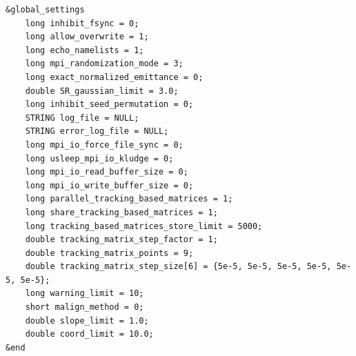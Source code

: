 \documentclass[11pt]{article}
\begin{document}
\begin{verbatim}
&global_settings
    long inhibit_fsync = 0;
    long allow_overwrite = 1;
    long echo_namelists = 1;
    long mpi_randomization_mode = 3;
    long exact_normalized_emittance = 0;
    double SR_gaussian_limit = 3.0;
    long inhibit_seed_permutation = 0;
    STRING log_file = NULL;
    STRING error_log_file = NULL;
    long mpi_io_force_file_sync = 0;
    long usleep_mpi_io_kludge = 0;
    long mpi_io_read_buffer_size = 0;
    long mpi_io_write_buffer_size = 0;
    long parallel_tracking_based_matrices = 1;
    long share_tracking_based_matrices = 1;
    long tracking_based_matrices_store_limit = 5000;
    double tracking_matrix_step_factor = 1;
    double tracking_matrix_points = 9;
    double tracking_matrix_step_size[6] = {5e-5, 5e-5, 5e-5, 5e-5, 5e-5, 5e-5};
    long warning_limit = 10;
    short malign_method = 0;
    double slope_limit = 1.0;
    double coord_limit = 10.0;
&end
\end{verbatim}
\end{document}
